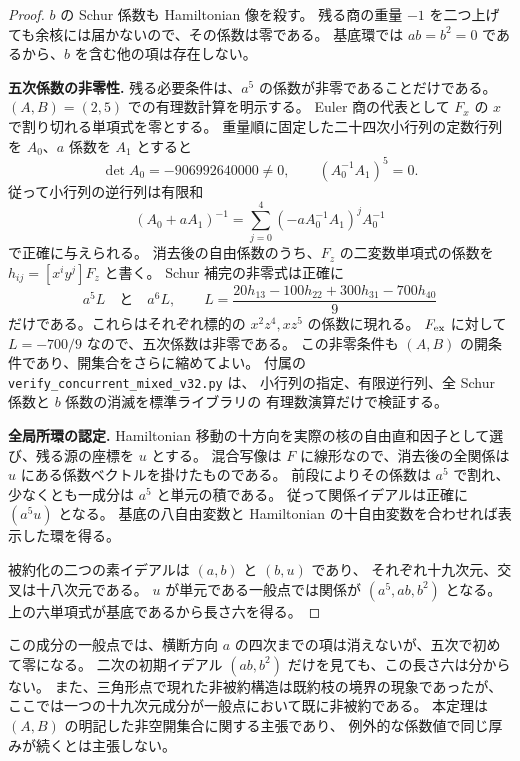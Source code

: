 \begin{proof}
$b$ の Schur 係数も Hamiltonian 像を殺す。
残る商の重量 $-1$ を二つ上げても余核には届かないので、その係数は零である。
基底環では $ab=b^2=0$ であるから、$b$ を含む他の項は存在しない。

\smallskip\noindent
\textbf{五次係数の非零性.}
残る必要条件は、$a^5$ の係数が非零であることだけである。
$(A,B)=(2,5)$ での有理数計算を明示する。
Euler 商の代表として $F_x$ の $x$ で割り切れる単項式を零とする。
重量順に固定した二十四次小行列の定数行列を $A_0$、$a$ 係数を $A_1$ とすると
\[
 \det A_0=-906992640000\ne0,\qquad (A_0^{-1}A_1)^5=0.
\]
従って小行列の逆行列は有限和
\[
 (A_0+aA_1)^{-1}
 =\sum_{j=0}^4(-aA_0^{-1}A_1)^jA_0^{-1}
\]
で正確に与えられる。
消去後の自由係数のうち、$F_z$ の二変数単項式の係数を $h_{ij}=[x^iy^j]F_z$ と書く。
Schur 補完の非零式は正確に
\[
 a^5 L\quad\text{と}\quad a^6 L,
 \qquad
 L=\frac{20h_{13}-100h_{22}+300h_{31}-700h_{40}}9
\]
だけである。これらはそれぞれ標的の $x^2z^4,xz^5$ の係数に現れる。
$F_{\rm ex}$ に対して $L=-700/9$ なので、五次係数は非零である。
この非零条件も $(A,B)$ の開条件であり、開集合をさらに縮めてよい。
付属の \texttt{verify\_concurrent\_mixed\_v32.py} は、
小行列の指定、有限逆行列、全 Schur 係数と $b$ 係数の消滅を標準ライブラリの
有理数演算だけで検証する。

\smallskip\noindent
\textbf{全局所環の認定.}
Hamiltonian 移動の十方向を実際の核の自由直和因子として選び、残る源の座標を $u$ とする。
混合写像は $F$ に線形なので、消去後の全関係は $u$ にある係数ベクトルを掛けたものである。
前段によりその係数は $a^5$ で割れ、少なくとも一成分は $a^5$ と単元の積である。
従って関係イデアルは正確に $(a^5u)$ となる。
基底の八自由変数と Hamiltonian の十自由変数を合わせれば表示した環を得る。

被約化の二つの素イデアルは $(a,b)$ と $(b,u)$ であり、
それぞれ十九次元、交叉は十八次元である。
$u$ が単元である一般点では関係が $(a^5,ab,b^2)$ となる。
上の六単項式が基底であるから長さ六を得る。
\end{proof}

\begin{remark}[一般点の厚みと低次検査]
この成分の一般点では、横断方向 $a$ の四次までの項は消えないが、五次で初めて零になる。
二次の初期イデアル $(ab,b^2)$ だけを見ても、この長さ六は分からない。
また、三角形点で現れた非被約構造は既約枝の境界の現象であったが、
ここでは一つの十九次元成分が一般点において既に非被約である。
本定理は $(A,B)$ の明記した非空開集合に関する主張であり、
例外的な係数値で同じ厚みが続くとは主張しない。
\end{remark}
